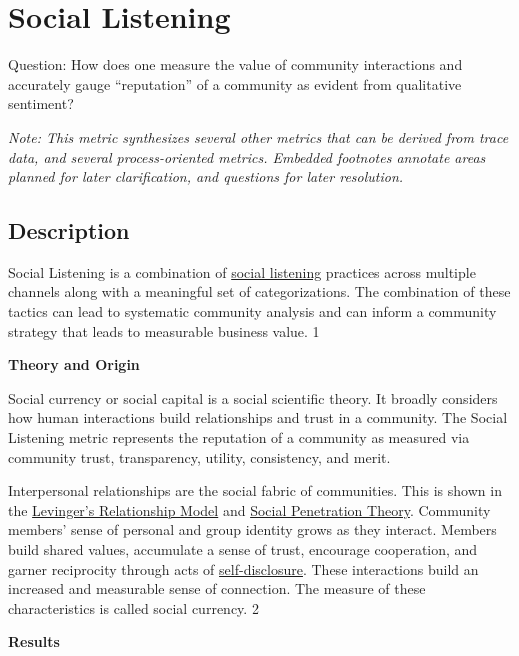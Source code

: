 \hypertarget{social-listening}{%
\section{Social Listening}\label{social-listening}}

Question: How does one measure the value of community interactions and
accurately gauge ``reputation'' of a community as evident from
qualitative sentiment?

\emph{Note: This metric synthesizes several other metrics that can be
derived from trace data, and several process-oriented metrics. Embedded
footnotes annotate areas planned for later clarification, and questions
for later resolution.}

\hypertarget{description}{%
\subsection{Description}\label{description}}

Social Listening is a combination of
\href{https://blog.hubspot.com/service/social-listening}{social
listening} practices across multiple channels along with a meaningful
set of categorizations. The combination of these tactics can lead to
systematic community analysis and can inform a community strategy that
leads to measurable business value. 1

\textbf{Theory and Origin}

Social currency or social capital is a social scientific theory. It
broadly considers how human interactions build relationships and trust
in a community. The Social Listening metric represents the reputation of
a community as measured via community trust, transparency, utility,
consistency, and merit.

Interpersonal relationships are the social fabric of communities. This
is shown in the
\href{https://theadminzone.com/ams/levingers-stage-theory.1272/}{Levinger's
Relationship Model} and
\href{https://psycnet.apa.org/record/1973-28661-000}{Social Penetration
Theory}. Community members' sense of personal and group identity grows
as they interact. Members build shared values, accumulate a sense of
trust, encourage cooperation, and garner reciprocity through acts of
\href{https://en.wikipedia.org/wiki/Self-disclosure}{self-disclosure}.
These interactions build an increased and measurable sense of
connection. The measure of these characteristics is called social
currency. 2

\textbf{Results}

